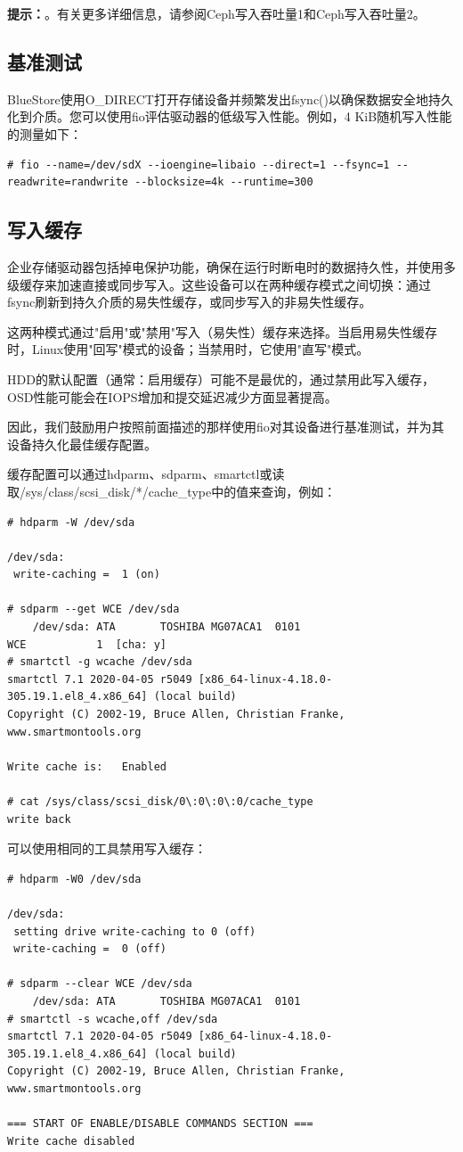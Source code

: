 \documentclass[12pt,UTF8]{ctexbook}
\begin{document}
\textbf{提示：}。有关更多详细信息，请参阅Ceph写入吞吐量1和Ceph写入吞吐量2。

\subsection{基准测试}
BlueStore使用O_DIRECT打开存储设备并频繁发出fsync()以确保数据安全地持久化到介质。您可以使用fio评估驱动器的低级写入性能。例如，4 KiB随机写入性能的测量如下：
\begin{verbatim}
# fio --name=/dev/sdX --ioengine=libaio --direct=1 --fsync=1 --readwrite=randwrite --blocksize=4k --runtime=300
\end{verbatim}

\subsection{写入缓存}
企业存储驱动器包括掉电保护功能，确保在运行时断电时的数据持久性，并使用多级缓存来加速直接或同步写入。这些设备可以在两种缓存模式之间切换：通过fsync刷新到持久介质的易失性缓存，或同步写入的非易失性缓存。

这两种模式通过"启用"或"禁用"写入（易失性）缓存来选择。当启用易失性缓存时，Linux使用"回写"模式的设备；当禁用时，它使用"直写"模式。

HDD的默认配置（通常：启用缓存）可能不是最优的，通过禁用此写入缓存，OSD性能可能会在IOPS增加和提交延迟减少方面显著提高。

因此，我们鼓励用户按照前面描述的那样使用fio对其设备进行基准测试，并为其设备持久化最佳缓存配置。

缓存配置可以通过hdparm、sdparm、smartctl或读取/sys/class/scsi_disk/*/cache_type中的值来查询，例如：
\begin{verbatim}
# hdparm -W /dev/sda

/dev/sda:
 write-caching =  1 (on)

# sdparm --get WCE /dev/sda
    /dev/sda: ATA       TOSHIBA MG07ACA1  0101
WCE           1  [cha: y]
# smartctl -g wcache /dev/sda
smartctl 7.1 2020-04-05 r5049 [x86_64-linux-4.18.0-305.19.1.el8_4.x86_64] (local build)
Copyright (C) 2002-19, Bruce Allen, Christian Franke, www.smartmontools.org

Write cache is:   Enabled

# cat /sys/class/scsi_disk/0\:0\:0\:0/cache_type
write back
\end{verbatim}

可以使用相同的工具禁用写入缓存：
\begin{verbatim}
# hdparm -W0 /dev/sda

/dev/sda:
 setting drive write-caching to 0 (off)
 write-caching =  0 (off)

# sdparm --clear WCE /dev/sda
    /dev/sda: ATA       TOSHIBA MG07ACA1  0101
# smartctl -s wcache,off /dev/sda
smartctl 7.1 2020-04-05 r5049 [x86_64-linux-4.18.0-305.19.1.el8_4.x86_64] (local build)
Copyright (C) 2002-19, Bruce Allen, Christian Franke, www.smartmontools.org

=== START OF ENABLE/DISABLE COMMANDS SECTION ===
Write cache disabled
\end{verbatim}
\end{document}
